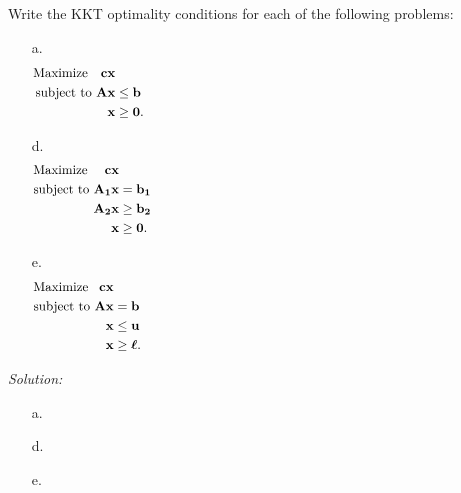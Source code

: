 \documentclass[12pt]{amsart}
\begin{document}
\setcounter{subsection}{40}
\subsection{}
Write the KKT optimality conditions for each of the following problems:
\begin{enumerate}
	\item[a.] \begin{align*}
		\text{Maximize }\,\,\ \mathbf{cx} & \hspace{75ex}\\
		\text{subject to  } \mathbf{Ax} &\leq \mathbf{b} \\
		\mathbf{x} &\geq \mathbf{0}.
	\end{align*}
	\item[d.]\begin{align*}
		\text{Maximize }\quad \mathbf{cx} & \hspace{75ex}\\
		\text{subject to  } \mathbf{A_1x} &= \mathbf{b_1} \\
		\mathbf{A_2x} &\geq \mathbf{b_2} \\
		\mathbf{x} &\geq \mathbf{0}.
	\end{align*}
	\item[e.] \begin{align*}
		\text{Maximize }\,\ \mathbf{cx} & \hspace{75ex}\\
		\text{subject to  } \mathbf{Ax} &= \mathbf{b} \\
		\mathbf{x} &\leq \mathbf{u} \\
		\mathbf{x} &\geq \boldsymbol{\ell}.
	\end{align*}
\end{enumerate}

\bigskip
\textit{Solution:}

\begin{enumerate}
	\item[a.]
	
	
	\item[d.]
	
	
	\item[e.]
	
	
\end{enumerate}
\end{document}
